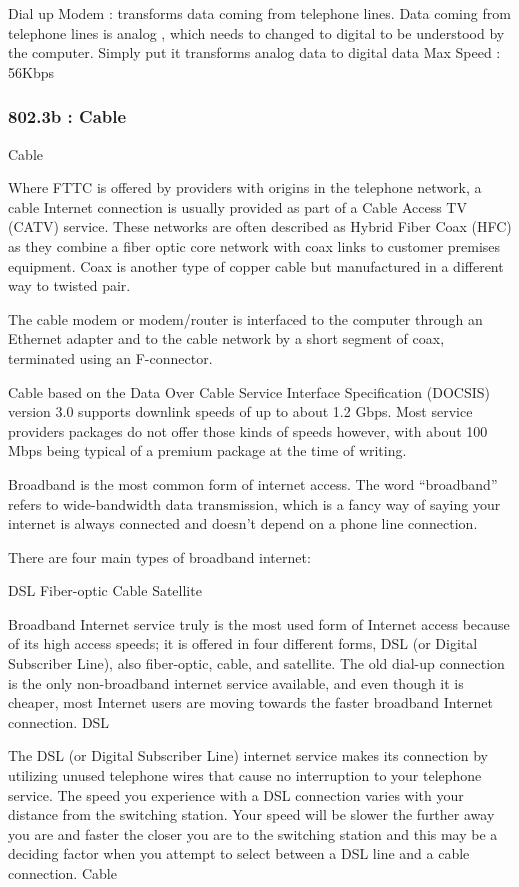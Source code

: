 Dial up Modem : transforms data coming from telephone lines. Data coming from
telephone lines is analog , which needs to changed to digital to be understood
by the computer. Simply put it transforms analog data to digital data
Max Speed : 56Kbps


\subsubsection{802.3b : Cable}
\label{sssec:802_3b_cable}


Cable

Where FTTC is offered by providers with origins in the telephone network, a cable Internet connection is usually provided as part of a Cable Access TV (CATV) service. These networks are often described as Hybrid Fiber Coax (HFC) as they combine a fiber optic core network with coax links to customer premises equipment. Coax is another type of copper cable but manufactured in a different way to twisted pair.

The cable modem or modem/router is interfaced to the computer through an Ethernet adapter and to the cable network by a short segment of coax, terminated using an F-connector.

Cable based on the Data Over Cable Service Interface Specification (DOCSIS) version 3.0 supports downlink speeds of up to about 1.2 Gbps. Most service providers packages do not offer those kinds of speeds however, with about 100 Mbps being typical of a premium package at the time of writing. 

Broadband is the most common form of internet access. The word “broadband”
refers to wide-bandwidth data transmission, which is a fancy way of saying your
internet is always connected and doesn’t depend on a phone line connection.

There are four main types of broadband internet:

    DSL
    Fiber-optic
    Cable
    Satellite


Broadband Internet service truly is the most used form of Internet access
because of its high access speeds; it is offered in four different forms, DSL
(or Digital Subscriber Line), also fiber-optic, cable, and satellite. The old
dial-up connection is the only non-broadband internet service available, and
even though it is cheaper, most Internet users are moving towards the faster
broadband Internet connection.  DSL

The DSL (or Digital Subscriber Line) internet service makes its connection by
utilizing unused telephone wires that cause no interruption to your telephone
service. The speed you experience with a DSL connection varies with your
distance from the switching station. Your speed will be slower the further away
you are and faster the closer you are to the switching station and this may be a
deciding factor when you attempt to select between a DSL line and a cable
connection.  Cable

